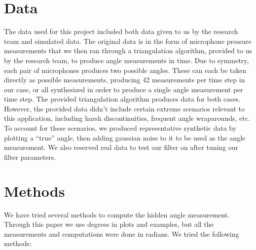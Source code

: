 \documentclass[11pt]{amsart}
\begin{document}
\section{Data}
The data used for this project included both data given to us by the research team and simulated data. The original data is in the form of microphone pressure measurements that we then ran through a triangulation algorithm, provided to us by the research team, to produce angle measurements in time. Due to symmetry, each pair of microphones produces two possible angles. These can each be taken directly as possible measurements, producing 42 measurements per time step in our case, or all synthesized in order to produce a single angle measurement per time step. The provided triangulation algorithm produces data for both cases.
However, the provided data didn’t include certain extreme scenarios relevant to this application, including harsh discontinuities, frequent angle wraparounds, etc. To account for these scenarios, we produced representative synthetic data by plotting a “true” angle, then adding gaussian noise to it to be used as the angle measurement. We also reserved real data to test our filter on after tuning our filter parameters.



\section{Methods}
We have tried several methods to compute the hidden angle measurement. Through this paper we use degrees in plots and examples, but all the measurements and computations were done in radians. We tried the following methods:
\end{document}
